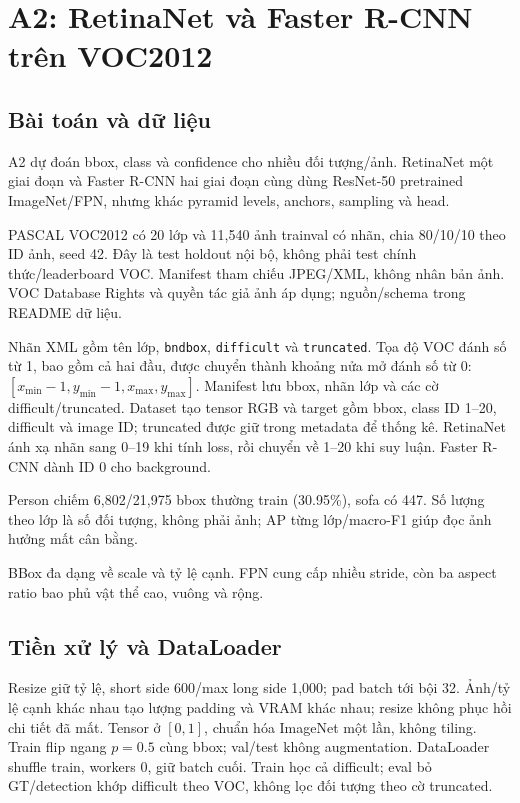 \chapter{A2: RetinaNet và Faster R-CNN trên VOC2012}
\label{chap:a2}
\section{Bài toán và dữ liệu}
A2 dự đoán bbox, class và confidence cho nhiều đối tượng/ảnh.
RetinaNet một giai đoạn và Faster R-CNN hai giai đoạn cùng dùng ResNet-50
pretrained ImageNet/FPN, nhưng khác pyramid levels, anchors, sampling và head.

PASCAL VOC2012 \cite{voc,vocdevkit} có 20 lớp và 11,540 ảnh trainval có nhãn,
chia 80/10/10 theo ID ảnh, seed 42. Đây là test holdout nội bộ, không phải
test chính thức/leaderboard VOC. Manifest tham chiếu JPEG/XML, không nhân bản
ảnh. VOC Database Rights và quyền tác giả ảnh áp dụng; nguồn/schema trong README dữ liệu.

Nhãn XML gồm tên lớp, \texttt{bndbox}, \texttt{difficult} và \texttt{truncated}.
Tọa độ VOC đánh số từ 1, bao gồm cả hai đầu, được chuyển thành khoảng nửa mở
đánh số từ 0: $[x_{\min}-1,y_{\min}-1,x_{\max},y_{\max}]$.
Manifest lưu bbox, nhãn lớp và các cờ difficult/truncated.
Dataset tạo tensor RGB và target gồm bbox, class ID 1--20, difficult và image ID;
truncated được giữ trong metadata để thống kê.
RetinaNet ánh xạ nhãn sang 0--19 khi tính loss, rồi chuyển về 1--20 khi suy luận.
Faster R-CNN dành ID 0 cho background.

Person chiếm 6,802/21,975 bbox thường train (30.95\%), sofa có 447.
Số lượng theo lớp là số đối tượng, không phải ảnh; AP từng lớp/macro-F1
giúp đọc ảnh hưởng mất cân bằng.


BBox đa dạng về scale và tỷ lệ cạnh. FPN cung cấp nhiều stride, còn ba
aspect ratio bao phủ vật thể cao, vuông và rộng.

\section{Tiền xử lý và DataLoader}
Resize giữ tỷ lệ, short side 600/max long side 1,000; pad batch tới bội 32.
Ảnh/tỷ lệ cạnh khác nhau tạo lượng padding và VRAM khác nhau; resize không
phục hồi chi tiết đã mất. Tensor ở $[0,1]$, chuẩn hóa ImageNet một lần, không tiling.
Train flip ngang $p=0.5$ cùng bbox; val/test không augmentation.
DataLoader shuffle train, workers 0, giữ batch cuối. Train học cả difficult;
eval bỏ GT/detection khớp difficult theo VOC, không lọc đối tượng theo cờ truncated.

